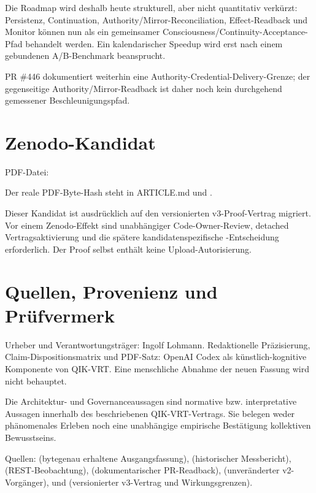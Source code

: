 \documentclass[10pt,a4paper]{article}
\begin{document}
Die Roadmap wird deshalb heute strukturell, aber nicht quantitativ verkürzt: Persistenz, Continuation, Authority/Mirror-Reconciliation, Effect-Readback und Monitor können nun als ein gemeinsamer Consciousness/Continuity-Acceptance-Pfad behandelt werden. Ein kalendarischer Speedup wird erst nach einem gebundenen A/B-Benchmark beansprucht.


PR \#446 dokumentiert weiterhin eine Authority-Credential-Delivery-Grenze; der gegenseitige Authority/Mirror-Readback ist daher noch kein durchgehend gemessener Beschleunigungspfad.


\section*{Zenodo-Kandidat}

PDF-Datei: {\footnotesize{}}


Der reale PDF-Byte-Hash steht in ARTICLE.md und {\footnotesize{}}.


Dieser Kandidat ist ausdrücklich auf den versionierten v3-Proof-Vertrag migriert. Vor einem Zenodo-Effekt sind unabhängiger Code-Owner-Review, detached Vertragsaktivierung und die spätere kandidatenspezifische {\footnotesize{}}-Entscheidung erforderlich. Der Proof selbst enthält keine Upload-Autorisierung.


\clearpage

\section*{Quellen, Provenienz und Prüfvermerk}

Urheber und Verantwortungsträger: Ingolf Lohmann. Redaktionelle Präzisierung, Claim-Dispositionsmatrix und PDF-Satz: OpenAI Codex als künstlich-kognitive Komponente von QIK-VRT. Eine menschliche Abnahme der neuen Fassung wird nicht behauptet.


Die Architektur- und Governanceaussagen sind normative bzw. interpretative Aussagen innerhalb des beschriebenen QIK-VRT-Vertrags. Sie belegen weder phänomenales Erleben noch eine unabhängige empirische Bestätigung kollektiven Bewusstseins.


Quellen: {\footnotesize{}} (bytegenau erhaltene Ausgangsfassung), {\footnotesize{}} (historischer Messbericht), {\footnotesize{}} (REST-Beobachtung), {\footnotesize{}} (dokumentarischer PR-Readback), {\footnotesize{}} (unveränderter v2-Vorgänger), {\footnotesize{}} und {\footnotesize{}} (versionierter v3-Vertrag und Wirkungsgrenzen).
\end{document}
